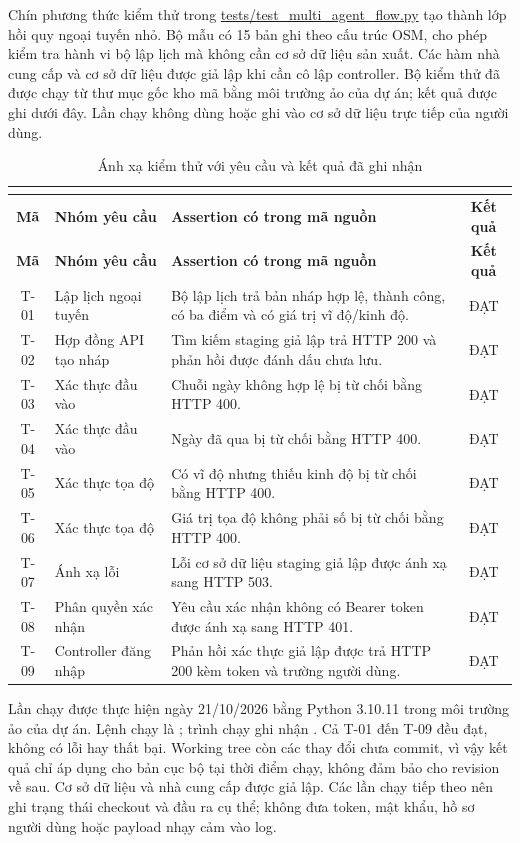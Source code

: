 Chín phương thức kiểm thử trong \url{tests/test_multi_agent_flow.py} tạo thành lớp hồi quy ngoại tuyến nhỏ. Bộ mẫu có 15 bản ghi theo cấu trúc OSM, cho phép kiểm tra hành vi bộ lập lịch mà không cần cơ sở dữ liệu sản xuất. Các hàm nhà cung cấp và cơ sở dữ liệu được giả lập khi cần cô lập controller. Bộ kiểm thử đã được chạy từ thư mục gốc kho mã bằng môi trường ảo của dự án; kết quả được ghi dưới đây. Lần chạy không dùng hoặc ghi vào cơ sở dữ liệu trực tiếp của người dùng.

\begin{longtable}{c >{\raggedright\arraybackslash}p{4.4cm} >{\raggedright\arraybackslash}p{7.4cm} c}
\caption{Ánh xạ kiểm thử với yêu cầu và kết quả đã ghi nhận}\\
\label{tab:test_mapping}\\
\toprule
\textbf{Mã} & \textbf{Nhóm yêu cầu} & \textbf{Assertion có trong mã nguồn} & \textbf{Kết quả}\\
\midrule
\endfirsthead
\toprule
\textbf{Mã} & \textbf{Nhóm yêu cầu} & \textbf{Assertion có trong mã nguồn} & \textbf{Kết quả}\\
\midrule
\endhead
T-01 & Lập lịch ngoại tuyến & Bộ lập lịch trả bản nháp hợp lệ, thành công, có ba điểm và có giá trị vĩ độ/kinh độ. & ĐẠT\\
T-02 & Hợp đồng API tạo nháp & Tìm kiếm staging giả lập trả HTTP 200 và phản hồi được đánh dấu chưa lưu. & ĐẠT\\
T-03 & Xác thực đầu vào & Chuỗi ngày không hợp lệ bị từ chối bằng HTTP 400. & ĐẠT\\
T-04 & Xác thực đầu vào & Ngày đã qua bị từ chối bằng HTTP 400. & ĐẠT\\
T-05 & Xác thực tọa độ & Có vĩ độ nhưng thiếu kinh độ bị từ chối bằng HTTP 400. & ĐẠT\\
T-06 & Xác thực tọa độ & Giá trị tọa độ không phải số bị từ chối bằng HTTP 400. & ĐẠT\\
T-07 & Ánh xạ lỗi & Lỗi cơ sở dữ liệu staging giả lập được ánh xạ sang HTTP 503. & ĐẠT\\
T-08 & Phân quyền xác nhận & Yêu cầu xác nhận không có Bearer token được ánh xạ sang HTTP 401. & ĐẠT\\
T-09 & Controller đăng nhập & Phản hồi xác thực giả lập được trả HTTP 200 kèm token và trường người dùng. & ĐẠT\\
\bottomrule
\end{longtable}

Lần chạy được thực hiện ngày 21/10/2026 bằng Python 3.10.11 trong môi trường ảo của dự án. Lệnh chạy là ; trình chạy ghi nhận . Cả T-01 đến T-09 đều đạt, không có lỗi hay thất bại. Working tree còn các thay đổi chưa commit, vì vậy kết quả chỉ áp dụng cho bản cục bộ tại thời điểm chạy, không đảm bảo cho revision về sau. Cơ sở dữ liệu và nhà cung cấp được giả lập. Các lần chạy tiếp theo nên ghi trạng thái checkout và đầu ra cụ thể; không đưa token, mật khẩu, hồ sơ người dùng hoặc payload nhạy cảm vào log.

